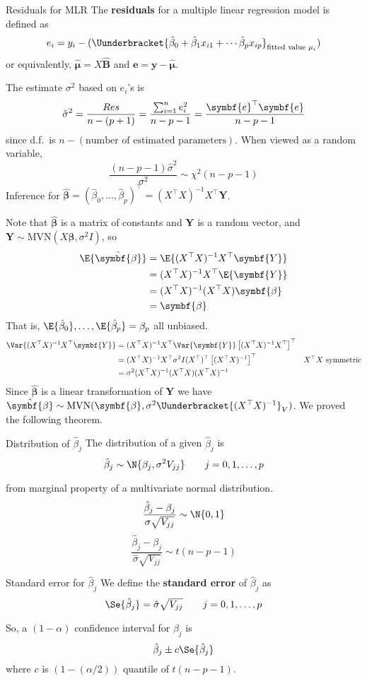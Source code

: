 \begin{Definition}{Residuals for MLR}{}
    The \textbf{residuals} for a multiple linear regression model is defined
    as
    \[ e_i=y_i-(\Uunderbracket{\hat{\beta}_0+\hat{\beta}_1x_{i1}+\cdots\hat{\beta}_p x_{ip}
        }_{\text{fitted value }\mu_i}) \]
    or equivalently, $ \hat{\symbf{\mu}}=X\hat{\symbf{B}} $ and
    $ \symbf{e}=\symbf{y}-\hat{\symbf{\mu}} $.
\end{Definition}
The estimate $ \sigma^2 $ based on $ e_i $'s is
\[ \hat{\sigma}^2=\frac{\SS{Res}}{n-(p+1)}=
    \frac{\sum_{i=1}^{n} e_i^2}{n-p-1}=\frac{\symbf{e}^\top\symbf{e}}{n-p-1}  \]
since d.f.\ is $ n-(\text{number of estimated parameters}) $. When viewed
as a random variable,
\[ \frac{(n-p-1)\hat{\sigma}^2}{\sigma^2}\sim \chi^2(n-p-1)  \]
Inference for $ \hat{\symbf{\beta}}=(\hat{\beta}_0,\ldots,\hat{\beta}_p)^\top
    =(X^\top X)^{-1}X^\top \symbf{Y} $.

Note that $ \hat{\symbf{\beta}} $ is a matrix of constants and
$ \symbf{Y} $ is a random vector, and
$ \symbf{Y}\sim \text{MVN}(X\symbf{\beta},\sigma^2 I) $, so
\begin{align*}
    \E{\hat{\symbf{\beta}}}
     & =\E{(X^\top X)^{-1}X^\top \symbf{Y}}    \\
     & =(X^\top X)^{-1}X^\top\E{\symbf{Y}}     \\
     & =(X^\top X)^{-1}(X^\top X)\symbf{\beta} \\
     & =\symbf{\beta}
\end{align*}
That is, $ \E{\hat{\beta}_0},\ldots,\E{\hat{\beta}_p}=\beta_p $
all unbiased.
\begin{align*}
    \Var{(X^\top X)^{-1}X^\top\symbf{Y}}
     & =(X^\top X)^{-1}X^{\top}\Var{\symbf{Y}}\left[ (X^\top X)^{-1}X^\top \right]^\top                              \\
     & =(X^\top X)^{-1}X^\top \sigma^2 I(X^\top)^\top\left[ (X^\top X)^{-1} \right]^\top & X^\top X\text{ symmetric} \\
     & =\sigma^2(X^\top X)^{-1}(X^\top X)(X^\top X)^{-1}
\end{align*}
Since $ \hat{\symbf{\beta}} $ is a linear transformation of $ \symbf{Y} $
we have
$ \hat{\symbf{\beta}} \sim \text{MVN}(\symbf{\beta},\sigma^2
    \Uunderbracket{(X^\top X)^{-1}}_{V}) $. We proved the following theorem.
\begin{Theorem}{Distribution of $ \hat{\beta}_j $}{}
    The distribution of a given $ \hat{\beta}_j $ is
    \[ \hat{\beta}_j \sim \N{\beta_j,\sigma^2 V_{jj}}\qquad j=0,1,\ldots,p \]
\end{Theorem}
from marginal property of a multivariate normal distribution.
\[ \frac{\hat{\beta}_j-\beta_j}{\sigma\sqrt{V_{jj}}} \sim \N{0,1}  \]
\[ \frac{\hat{\beta}_j-\beta_j}{\hat{\sigma}\sqrt{V_{jj}}} \sim t(n-p-1)  \]
\begin{Definition}{Standard error for $ \hat{\beta}_j $}{}
    We define the \textbf{standard error} of $ \hat{\beta}_j $ as
    \[ \Se{\hat{\beta}_j}=\hat{\sigma}\sqrt{V_{jj}}\qquad j=0,1,\ldots,p  \]
\end{Definition}
So, a $ (1-\alpha) $ confidence interval for $ \beta_j $
is
\[ \hat{\beta}_j\pm c\Se{\hat{\beta}_j} \]
where $ c $ is $ (1-(\alpha/2)) $ quantile of $ t(n-p-1) $.

